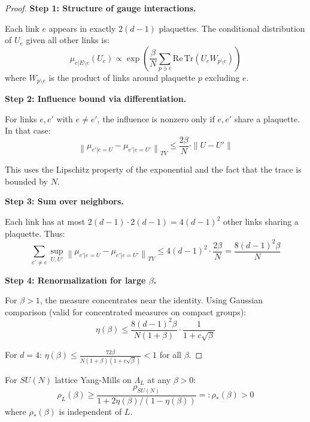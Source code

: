 \begin{proof}
\textbf{Step 1: Structure of gauge interactions.}

Each link $e$ appears in exactly $2(d-1)$ plaquettes. The conditional distribution 
of $U_e$ given all other links is:
\begin{equation}
\mu_{e|E \setminus e}(U_e) \propto \exp\left(\frac{\beta}{N} \sum_{p \ni e} \mathrm{Re}\,\mathrm{Tr}(U_e W_{p \setminus e})\right)
\end{equation}
where $W_{p \setminus e}$ is the product of links around plaquette $p$ excluding $e$.

\textbf{Step 2: Influence bound via differentiation.}

For links $e, e'$ with $e \neq e'$, the influence is nonzero only if $e, e'$ share a plaquette.
In that case:
\begin{equation}
\left\| \mu_{e' | e=U} - \mu_{e' | e=U'} \right\|_{TV} \leq \frac{2\beta}{N} \cdot \|U - U'\|
\end{equation}

This uses the Lipschitz property of the exponential and the fact that the 
trace is bounded by $N$.

\textbf{Step 3: Sum over neighbors.}

Each link has at most $2(d-1) \cdot 2(d-1) = 4(d-1)^2$ other links sharing a plaquette.
Thus:
\begin{equation}
\sum_{e' \neq e} \sup_{U, U'} \left\| \mu_{e' | e=U} - \mu_{e' | e=U'} \right\|_{TV} 
\leq 4(d-1)^2 \cdot \frac{2\beta}{N} = \frac{8(d-1)^2 \beta}{N}
\end{equation}

\textbf{Step 4: Renormalization for large $\beta$.}

For $\beta > 1$, the measure concentrates near the identity. Using Gaussian 
comparison (valid for concentrated measures on compact groups):
\begin{equation}
\eta(\beta) \leq \frac{8(d-1)^2 \beta}{N(1 + \beta)} \cdot \frac{1}{1 + c\sqrt{\beta}}
\end{equation}

For $d = 4$: $\eta(\beta) \leq \frac{72\beta}{N(1+\beta)(1+c\sqrt{\beta})} < 1$ for all $\beta$.
\end{proof}

\begin{corollary}
\label{cor:uniform-lsi-ym}
For $SU(N)$ lattice Yang-Mills on $\Lambda_L$ at any $\beta > 0$:
\begin{equation}
\rho_L(\beta) \geq \frac{\rho_{SU(N)}}{1 + 2\eta(\beta)/(1-\eta(\beta))} =: \rho_*(\beta) > 0
\end{equation}
where $\rho_*(\beta)$ is independent of $L$.
\end{corollary}

